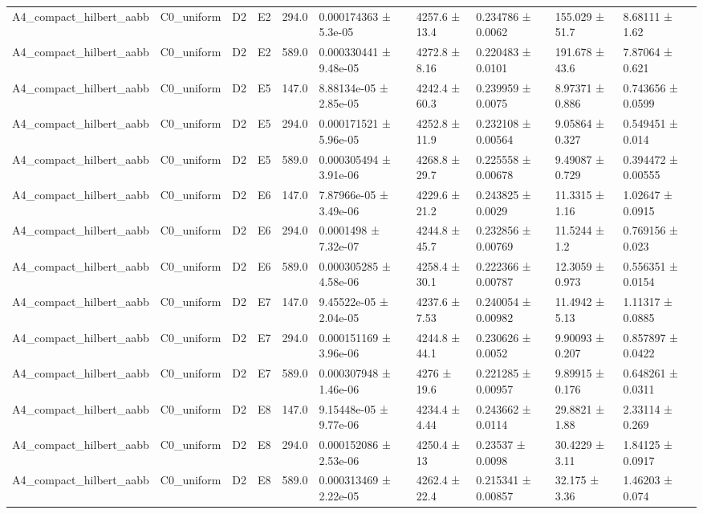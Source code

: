 \begin{table}
\begin{tabular}{llllllllll}
A4\_compact\_hilbert\_aabb & C0\_uniform & D2 & E2 & 294.0 & 0.000174363 ± 5.3e-05 & 4257.6 ± 13.4 & 0.234786 ± 0.0062 & 155.029 ± 51.7 & 8.68111 ± 1.62 \\
A4\_compact\_hilbert\_aabb & C0\_uniform & D2 & E2 & 589.0 & 0.000330441 ± 9.48e-05 & 4272.8 ± 8.16 & 0.220483 ± 0.0101 & 191.678 ± 43.6 & 7.87064 ± 0.621 \\
A4\_compact\_hilbert\_aabb & C0\_uniform & D2 & E5 & 147.0 & 8.88134e-05 ± 2.85e-05 & 4242.4 ± 60.3 & 0.239959 ± 0.0075 & 8.97371 ± 0.886 & 0.743656 ± 0.0599 \\
A4\_compact\_hilbert\_aabb & C0\_uniform & D2 & E5 & 294.0 & 0.000171521 ± 5.96e-05 & 4252.8 ± 11.9 & 0.232108 ± 0.00564 & 9.05864 ± 0.327 & 0.549451 ± 0.014 \\
A4\_compact\_hilbert\_aabb & C0\_uniform & D2 & E5 & 589.0 & 0.000305494 ± 3.91e-06 & 4268.8 ± 29.7 & 0.225558 ± 0.00678 & 9.49087 ± 0.729 & 0.394472 ± 0.00555 \\
A4\_compact\_hilbert\_aabb & C0\_uniform & D2 & E6 & 147.0 & 7.87966e-05 ± 3.49e-06 & 4229.6 ± 21.2 & 0.243825 ± 0.0029 & 11.3315 ± 1.16 & 1.02647 ± 0.0915 \\
A4\_compact\_hilbert\_aabb & C0\_uniform & D2 & E6 & 294.0 & 0.0001498 ± 7.32e-07 & 4244.8 ± 45.7 & 0.232856 ± 0.00769 & 11.5244 ± 1.2 & 0.769156 ± 0.023 \\
A4\_compact\_hilbert\_aabb & C0\_uniform & D2 & E6 & 589.0 & 0.000305285 ± 4.58e-06 & 4258.4 ± 30.1 & 0.222366 ± 0.00787 & 12.3059 ± 0.973 & 0.556351 ± 0.0154 \\
A4\_compact\_hilbert\_aabb & C0\_uniform & D2 & E7 & 147.0 & 9.45522e-05 ± 2.04e-05 & 4237.6 ± 7.53 & 0.240054 ± 0.00982 & 11.4942 ± 5.13 & 1.11317 ± 0.0885 \\
A4\_compact\_hilbert\_aabb & C0\_uniform & D2 & E7 & 294.0 & 0.000151169 ± 3.96e-06 & 4244.8 ± 44.1 & 0.230626 ± 0.0052 & 9.90093 ± 0.207 & 0.857897 ± 0.0422 \\
A4\_compact\_hilbert\_aabb & C0\_uniform & D2 & E7 & 589.0 & 0.000307948 ± 1.46e-06 & 4276 ± 19.6 & 0.221285 ± 0.00957 & 9.89915 ± 0.176 & 0.648261 ± 0.0311 \\
A4\_compact\_hilbert\_aabb & C0\_uniform & D2 & E8 & 147.0 & 9.15448e-05 ± 9.77e-06 & 4234.4 ± 4.44 & 0.243662 ± 0.0114 & 29.8821 ± 1.88 & 2.33114 ± 0.269 \\
A4\_compact\_hilbert\_aabb & C0\_uniform & D2 & E8 & 294.0 & 0.000152086 ± 2.53e-06 & 4250.4 ± 13 & 0.23537 ± 0.0098 & 30.4229 ± 3.11 & 1.84125 ± 0.0917 \\
A4\_compact\_hilbert\_aabb & C0\_uniform & D2 & E8 & 589.0 & 0.000313469 ± 2.22e-05 & 4262.4 ± 22.4 & 0.215341 ± 0.00857 & 32.175 ± 3.36 & 1.46203 ± 0.074 \\

\end{tabular}
\end{table}
